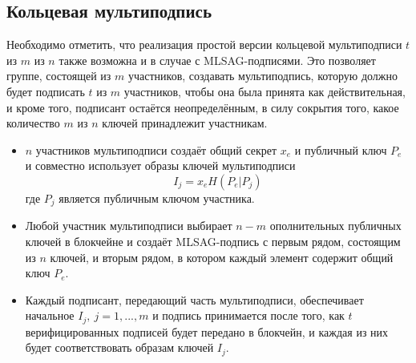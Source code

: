 \documentclass{mrl}
\theoremstyle{definition}
\numberwithin{thm}{section}
\begin{document}
\subsection{Кольцевая мультиподпись}
Необходимо отметить, что реализация простой версии кольцевой мультиподписи $t$ из $m$ из $n$ также возможна и в случае с MLSAG-подписями. Это позволяет группе, состоящей из $m$ участников, создавать мультиподпись, которую должно будет подписать $t$ из $m$ участников, чтобы она была принята как действительная, и кроме того, подписант остаётся неопределённым, в силу сокрытия того, какое количество $m$ из $n$ ключей принадлежит участникам.
\begin{itemize}
 \item $n$ участников мультиподписи создаёт общий секрет $x_e$ и публичный ключ $P_e$ и совместно использует образы ключей мультиподписи
 \[
I_j = x_e H(P_e | P_j)
 \]
где $P_j$ является публичным ключом участника.
 \item Любой участник мультиподписи выбирает $n-m$ ополнительных публичных ключей в блокчейне и создаёт MLSAG-подпись с первым рядом, состоящим из $n$ ключей, и вторым рядом, в котором каждый элемент содержит общий ключ $P_e$.
 \item Каждый подписант, передающий часть мультиподписи, обеспечивает начальное $I_j,\ j=1,...,m$ и подпись принимается после того, как $t$ верифицированных подписей будет передано в блокчейн, и каждая из них будет соответствовать образам ключей $I_j$.
\end{itemize}
\end{document}

